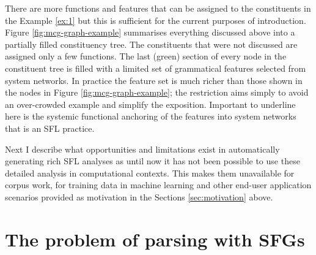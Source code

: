 There are more functions and features that can be assigned to the constituents in the Example \ref{ex:1} but this is sufficient for the current purposes of introduction. Figure \ref{fig:mcg-graph-example} summarises everything discussed above into a partially filled constituency tree. The constituents that were not discussed are assigned only a few functions. %
The last (green) section of every node in the constituent tree is filled with a limited set of grammatical features selected from system networks. In practice the feature set is much richer than those shown in the nodes in Figure \ref{fig:mcg-graph-example}; the restriction aims simply to avoid an over-crowded example and simplify the exposition. Important to underline here is the systemic functional anchoring of the features into system networks that is an SFL practice.


Next I describe what opportunities and limitations exist in automatically generating rich SFL analyses as until now it has not been possible to use these detailed analysis in computational contexts. This makes them unavailable for corpus work, for training data in machine learning and other end-user application scenarios provided as motivation in the Sections \ref{sec:motivation} above.

\section{The problem of parsing with SFGs}
\label{sec:problem}


